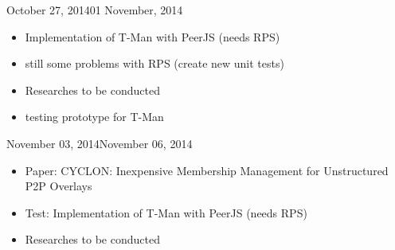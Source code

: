 \documentclass[11pt, english, screen]{report-rd-info}
\begin{document}
\begin{fichesuivi}{October 27, 2014}{01 November, 2014}

   \begin{travaileffectue}
      \begin{itemize}
          \item {Implementation of T-Man with PeerJS (needs RPS)}
     \end{itemize}
   \end{travaileffectue}

   \begin{travailnoneffectue}
      \begin{itemize}
          \item {still some problems with RPS (create new unit tests)}
     \end{itemize}
   \end{travailnoneffectue}

   \begin{echange}
   \end{echange}

   \begin{planification}
      \begin{itemize}
         \item Researches to be conducted
   \item {testing prototype for T-Man}
     \end{itemize}
   \end{planification}
\end{fichesuivi}

\begin{fichesuivi}{November 03, 2014}{November 06, 2014}

   \begin{travaileffectue}
      \begin{itemize}
          \item {Paper: CYCLON: Inexpensive Membership Management for Unstructured P2P Overlays}
          \item {Test: Implementation of T-Man with PeerJS (needs RPS)}
     \end{itemize}
   \end{travaileffectue}

   \begin{travailnoneffectue}
   \end{travailnoneffectue}

   \begin{echange}
   \end{echange}

   \begin{planification}
      \begin{itemize}
         \item Researches to be conducted
     \end{itemize}
   \end{planification}
\end{fichesuivi}
\end{document}
